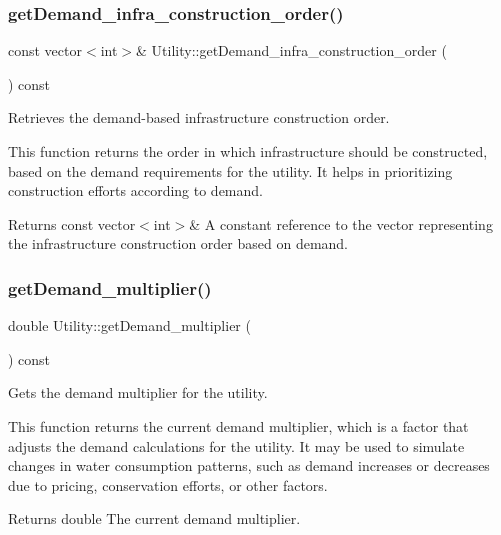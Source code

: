 \subsubsection{\texorpdfstring{get\+Demand\+\_\+infra\+\_\+construction\+\_\+order()}{getDemand\_infra\_construction\_order()}}
{\footnotesize\ttfamily const vector$<$int$>$\& Utility\+::get\+Demand\+\_\+infra\+\_\+construction\+\_\+order (\begin{DoxyParamCaption}{ }\end{DoxyParamCaption}) const}



Retrieves the demand-\/based infrastructure construction order. 

This function returns the order in which infrastructure should be constructed, based on the demand requirements for the utility. It helps in prioritizing construction efforts according to demand.

\begin{DoxyReturn}{Returns}
const vector$<$int$>$\& A constant reference to the vector representing the infrastructure construction order based on demand. 
\end{DoxyReturn}
\mbox{\label{classUtility_a04a400d8bfb89214632f9afca8c4eef5}} 
\subsubsection{\texorpdfstring{get\+Demand\+\_\+multiplier()}{getDemand\_multiplier()}}
{\footnotesize\ttfamily double Utility\+::get\+Demand\+\_\+multiplier (\begin{DoxyParamCaption}{ }\end{DoxyParamCaption}) const}



Gets the demand multiplier for the utility. 

This function returns the current demand multiplier, which is a factor that adjusts the demand calculations for the utility. It may be used to simulate changes in water consumption patterns, such as demand increases or decreases due to pricing, conservation efforts, or other factors.

\begin{DoxyReturn}{Returns}
double The current demand multiplier. 
\end{DoxyReturn}
\mbox{\label{classUtility_acdd0e90d638d4a127a06787fe427ab59}} 

